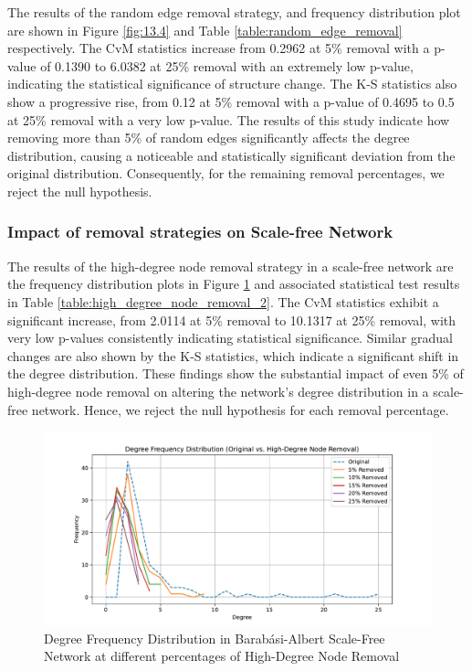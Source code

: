 \documentclass[conference]{IEEEtran} %
\begin{document}
The results of the random edge removal strategy, and frequency distribution plot are shown in Figure \ref{fig:13.4} and Table \ref{table:random_edge_removal} respectively. The CvM statistics increase from 0.2962 at 5\% removal with a p-value of 0.1390 to 6.0382 at 25\% removal with an extremely low p-value, indicating the statistical significance of structure change. The K-S statistics also show a progressive rise, from 0.12 at 5\% removal with a p-value of 0.4695 to 0.5 at 25\% removal with a very low p-value. The results of this study indicate how removing more than 5\% of random edges significantly affects the degree distribution, causing a noticeable and statistically significant deviation from the original distribution. Consequently, for the remaining removal percentages, we reject the null hypothesis.

\subsubsection{Impact of removal strategies on Scale-free Network}

The results of the high-degree node removal strategy in a scale-free network are the frequency distribution plots in Figure \ref{fig:14.1} and associated statistical test results in Table \ref{table:high_degree_node_removal_2}. The CvM statistics exhibit a significant increase, from 2.0114 at 5\% removal to 10.1317 at 25\% removal, with very low p-values consistently indicating statistical significance. Similar gradual changes are also shown by the K-S statistics, which indicate a significant shift in the degree distribution. These findings show the substantial impact of even 5\% of high-degree node removal on altering the network's degree distribution in a scale-free network. Hence, we reject the null hypothesis for each removal percentage.

\begin{figure}[t]
  \centering
  \includegraphics[width=1.1\linewidth]{scale_free_network_frequency_distribution_plot_High-Degree Node Removal.pdf}
  \caption{Degree Frequency Distribution in Barabási-Albert Scale-Free Network at different percentages of High-Degree Node Removal}
  \label{fig:14.1}
\end{figure}
\end{document}
